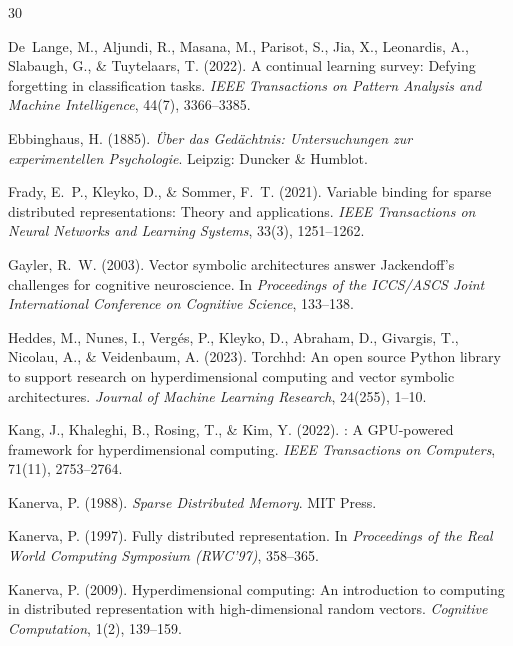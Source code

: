 \documentclass[11pt]{article}
\begin{document}
\begin{thebibliography}{30}

De~Lange, M., Aljundi, R., Masana, M., Parisot, S., Jia, X., Leonardis, A., Slabaugh, G., \& Tuytelaars, T. (2022).
\newblock A continual learning survey: Defying forgetting in classification tasks.
\newblock \textit{IEEE Transactions on Pattern Analysis and Machine Intelligence}, 44(7), 3366--3385.

Ebbinghaus, H. (1885).
\newblock \textit{{\"U}ber das Ged{\"a}chtnis: Untersuchungen zur experimentellen Psychologie}.
\newblock Leipzig: Duncker \& Humblot.

Frady, E.~P., Kleyko, D., \& Sommer, F.~T. (2021).
\newblock Variable binding for sparse distributed representations: Theory and applications.
\newblock \textit{IEEE Transactions on Neural Networks and Learning Systems}, 33(3), 1251--1262.

Gayler, R.~W. (2003).
\newblock Vector symbolic architectures answer {J}ackendoff's challenges for cognitive neuroscience.
\newblock In \textit{Proceedings of the ICCS/ASCS Joint International Conference on Cognitive Science}, 133--138.

Heddes, M., Nunes, I., Verg{\'e}s, P., Kleyko, D., Abraham, D., Givargis, T., Nicolau, A., \& Veidenbaum, A. (2023).
\newblock Torchhd: An open source {P}ython library to support research on hyperdimensional computing and vector symbolic architectures.
\newblock \textit{Journal of Machine Learning Research}, 24(255), 1--10.

Kang, J., Khaleghi, B., Rosing, T., \& Kim, Y. (2022).
: A {GPU}-powered framework for hyperdimensional computing.
\newblock \textit{IEEE Transactions on Computers}, 71(11), 2753--2764.

Kanerva, P. (1988).
\newblock \textit{Sparse Distributed Memory}.
\newblock MIT Press.

Kanerva, P. (1997).
\newblock Fully distributed representation.
\newblock In \textit{Proceedings of the Real World Computing Symposium (RWC'97)}, 358--365.

Kanerva, P. (2009).
\newblock Hyperdimensional computing: An introduction to computing in distributed representation with high-dimensional random vectors.
\newblock \textit{Cognitive Computation}, 1(2), 139--159.


\end{thebibliography}
\end{document}
